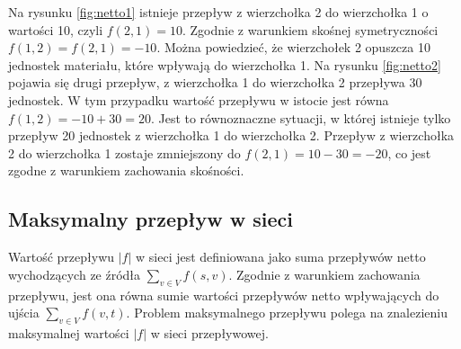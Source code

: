 Na rysunku \ref{fig:netto1} istnieje przepływ z wierzchołka 2 do wierzchołka 1 o wartości 10, czyli $ f(2, 1) = 10 $. Zgodnie z warunkiem skośnej symetryczności $ f(1, 2) = f(2, 1) = -10 $. Można powiedzieć, że wierzchołek 2 opuszcza 10 jednostek materiału, które wpływają do wierzchołka 1. Na rysunku \ref{fig:netto2} pojawia się drugi przepływ, z wierzchołka 1 do wierzchołka 2 przepływa 30 jednostek. W tym przypadku wartość przepływu w istocie jest równa $ f(1,2)=-10 + 30=20 $. Jest to równoznaczne sytuacji, w której istnieje tylko przepływ 20 jednostek z wierzchołka 1 do wierzchołka 2. Przepływ z wierzchołka 2 do wierzchołka 1 zostaje zmniejszony do $ f(2, 1)=10-30=-20 $, co jest zgodne z warunkiem zachowania skośności.
\subsection{Maksymalny przepływ w sieci}
Wartość przepływu $ |f| $ w sieci jest definiowana jako suma przepływów netto wychodzących ze źródła $ \sum_{v\in V}{f(s, v)} $. Zgodnie z warunkiem zachowania przepływu, jest ona równa sumie wartości przepływów netto wpływających do ujścia $ \sum_{v\in V}{f(v, t)} $. Problem maksymalnego przepływu polega na znalezieniu maksymalnej wartości $ |f| $ w sieci przepływowej.\cite{id:ZaawansowaneAlgorytmyStruktury}
